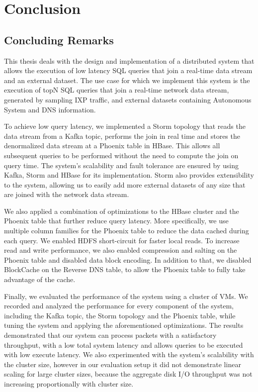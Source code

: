 \chapter{Conclusion}\label{chapter:conclusion}

\section{Concluding Remarks}

This thesis deals with the design and implementation of a distributed system that allows the execution of low latency SQL queries that join a real-time data stream and an external dataset. The use case for which we implement this system is the execution of topN SQL queries that join a real-time network data stream, generated by sampling IXP traffic, and external datasets containing Autonomous System and DNS information. 

To achieve low query latency, we implemented a Storm topology that reads the data stream from a Kafka topic, performs the join in real time and stores the denormalized data stream at a Phoenix table in HBase. This allows all subsequent queries to be performed without the need to compute the join on query time. The system's scalability and fault tolerance are ensured by using Kafka, Storm and HBase for its implementation. Storm also provides extensibility to the system, allowing us to easily add more external datasets of any size that are joined with the network data stream.

We also applied a combination of optimizations to the HBase cluster and the Phoenix table that further reduce query latency. More specifically, we use multiple column families for the Phoenix table to reduce the data cached during each query. We enabled HDFS short-circuit for faster local reads. To increase read and write performance, we also enabled compression and salting on the Phoenix table and disabled data block encoding. In addition to that, we disabled BlockCache on the Reverse DNS table, to allow the Phoenix table to fully take advantage of the cache.

Finally, we evaluated the performance of the system using a cluster of VMs. We recorded and analyzed the performance for every component of the system, including the Kafka topic, the Storm topology and the Phoenix table, while tuning the system and applying the aforementioned optimizations. The results demonstrated that our system can process packets with a satisfactory throughput, with a low total system latency and allows queries to be executed with low execute latency. We also experimented with the system's scalability with the cluster size, however in our evaluation setup it did not demonstrate linear scaling for large cluster sizes, because the aggregate disk I/O throughput was not increasing proportionally with cluster size.


